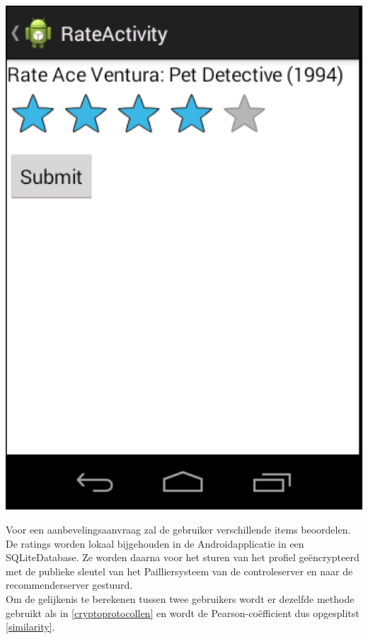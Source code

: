 \begin{center}
\centering
\includegraphics[scale=0.5]{fig/rate_item}

    \label{rate_item} 
 
\end{center}
Voor een aanbevelingsaanvraag zal de gebruiker verschillende items beoordelen. De ratings worden lokaal bijgehouden in de Androidapplicatie in een SQLiteDatabase. Ze worden daarna voor het sturen van het profiel ge\"encrypteerd met de publieke sleutel van het Pailliersysteem van de controleserver en naar de recommenderserver gestuurd. \\Om de gelijkenis te berekenen tussen twee gebruikers wordt er dezelfde methode gebruikt als in \ref{cryptoprotocollen} en wordt de Pearson-co\"efficient dus opgesplitst \eqref{similarity}.\\ 
